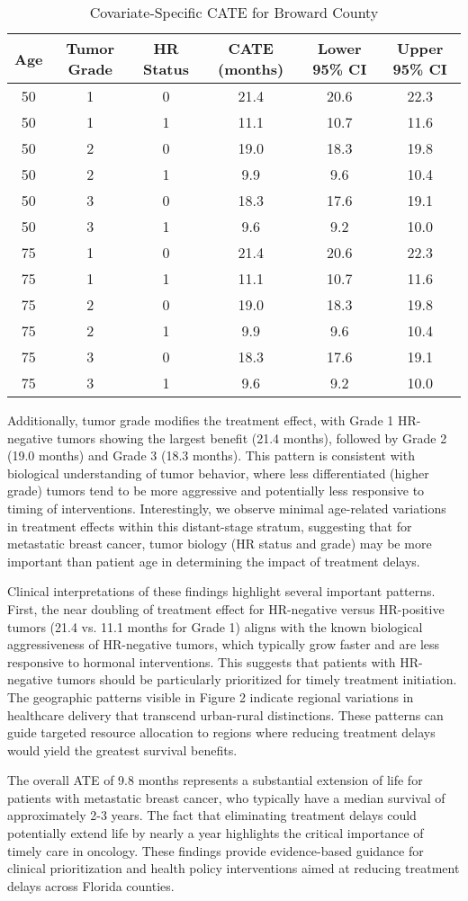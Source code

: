 \documentclass[useAMS,referee]{biom}
\begin{document}
\begin{table}[ht]
\centering
\caption{Covariate-Specific CATE for Broward County}
\begin{tabular}{cccccc}
\hline
Age & Tumor Grade & HR Status & CATE (months) & Lower 95\% CI & Upper 95\% CI \\
\hline
50 & 1 & 0 & 21.4 & 20.6 & 22.3 \\
50 & 1 & 1 & 11.1 & 10.7 & 11.6 \\
50 & 2 & 0 & 19.0 & 18.3 & 19.8 \\
50 & 2 & 1 & 9.9 & 9.6 & 10.4 \\
50 & 3 & 0 & 18.3 & 17.6 & 19.1 \\
50 & 3 & 1 & 9.6 & 9.2 & 10.0 \\
75 & 1 & 0 & 21.4 & 20.6 & 22.3 \\
75 & 1 & 1 & 11.1 & 10.7 & 11.6 \\
75 & 2 & 0 & 19.0 & 18.3 & 19.8 \\
75 & 2 & 1 & 9.9 & 9.6 & 10.4 \\
75 & 3 & 0 & 18.3 & 17.6 & 19.1 \\
75 & 3 & 1 & 9.6 & 9.2 & 10.0 \\
\hline
\end{tabular}
\end{table}

Additionally, tumor grade modifies the treatment effect, with Grade 1 HR-negative tumors showing the largest benefit (21.4 months), followed by Grade 2 (19.0 months) and Grade 3 (18.3 months). This pattern is consistent with biological understanding of tumor behavior, where less differentiated (higher grade) tumors tend to be more aggressive and potentially less responsive to timing of interventions. Interestingly, we observe minimal age-related variations in treatment effects within this distant-stage stratum, suggesting that for metastatic breast cancer, tumor biology (HR status and grade) may be more important than patient age in determining the impact of treatment delays.

Clinical interpretations of these findings highlight several important patterns. First, the near doubling of treatment effect for HR-negative versus HR-positive tumors (21.4 vs. 11.1 months for Grade 1) aligns with the known biological aggressiveness of HR-negative tumors, which typically grow faster and are less responsive to hormonal interventions. This suggests that patients with HR-negative tumors should be particularly prioritized for timely treatment initiation. The geographic patterns visible in Figure 2 indicate regional variations in healthcare delivery that transcend urban-rural distinctions. These patterns can guide targeted resource allocation to regions where reducing treatment delays would yield the greatest survival benefits.

The overall ATE of 9.8 months represents a substantial extension of life for patients with metastatic breast cancer, who typically have a median survival of approximately 2-3 years. The fact that eliminating treatment delays could potentially extend life by nearly a year highlights the critical importance of timely care in oncology. These findings provide evidence-based guidance for clinical prioritization and health policy interventions aimed at reducing treatment delays across Florida counties.
\end{document}
